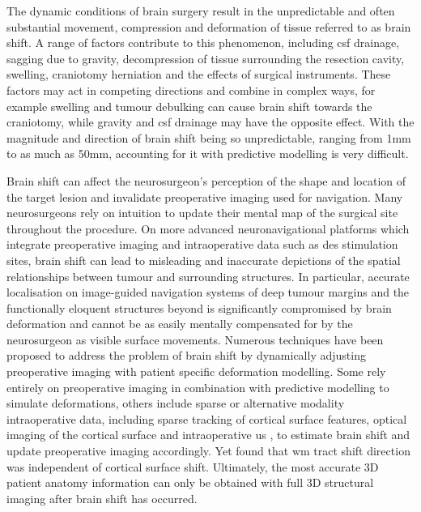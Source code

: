 The dynamic conditions of brain surgery result in the unpredictable and often substantial movement, compression and deformation of tissue referred to as brain shift.
A range of factors contribute to this phenomenon, including \gls{csf} drainage, sagging due to gravity, decompression of tissue surrounding the resection cavity, swelling, craniotomy herniation and the effects of surgical instruments\autocite{Gerard2017}.
These factors may act in competing directions and combine in complex ways, for example swelling and tumour debulking can cause brain shift towards the craniotomy, while gravity and \gls{csf} drainage may have the opposite effect\autocite{Roberts1998}.
With the magnitude and direction of brain shift being so unpredictable, ranging from 1mm to as much as 50mm\autocite{Gerard2017}, accounting for it with predictive modelling is very difficult\autocite{Bayer2017b}.

Brain shift can affect the neurosurgeon's perception of the shape and location of the target lesion and invalidate preoperative imaging used for navigation\autocite{Nimsky2000}.
Many neurosurgeons rely on intuition to update their mental map of the surgical site throughout the procedure.
On more advanced neuronavigational platforms which integrate preoperative imaging and intraoperative data such as \gls{des} stimulation sites, brain shift can lead to misleading and inaccurate depictions of the spatial relationships between tumour and surrounding structures.
In particular, accurate localisation on image-guided navigation systems of deep tumour margins and the functionally eloquent structures beyond is significantly compromised by brain deformation and cannot be as easily mentally compensated for by the neurosurgeon as visible surface movements\autocite{Nimsky2000}.
Numerous techniques have been proposed to address the problem of brain shift\autocite{Bayer2017b} by dynamically adjusting preoperative imaging with patient specific deformation modelling.
Some rely entirely on preoperative imaging in combination with predictive modelling to simulate deformations, others include sparse or alternative modality intraoperative data, including sparse tracking of cortical surface features\autocite{Luo2019}, optical imaging of the cortical surface\autocite{Skrinjar2002,Audette2005,Fan2017} and intraoperative \gls{us} \autocite{Letteboer2005,Reinertsen2007,Bucki2012,Machado2019}, to estimate brain shift and update preoperative imaging accordingly.
Yet \textcite{Yang2017a} found that \gls{wm} tract shift direction was independent of cortical surface shift.
Ultimately, the most accurate 3D patient anatomy information can only be obtained with full 3D structural imaging after brain shift has occurred.

